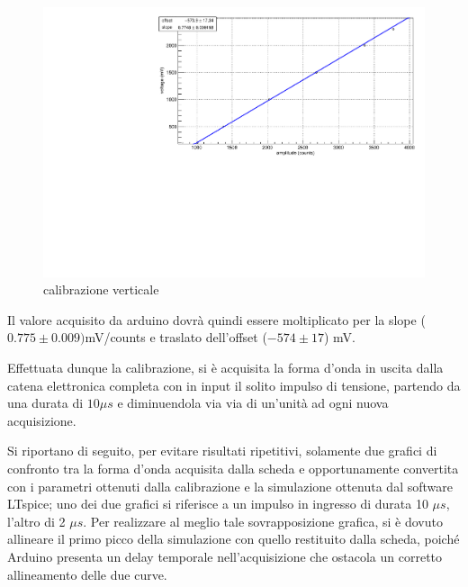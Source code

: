 \documentclass{article}
\begin{document}
\begin{center}
\begin{figure}[H]
\centering
\includegraphics[scale=0.4, angle=0]{calibverticale.pdf}
\caption{calibrazione verticale}
\label{fig:calibtempi}
\end{figure}
\end{center}

Il valore acquisito da arduino dovrà quindi essere moltiplicato per la slope ($0.775 \pm 0.009)$mV/counts
e traslato dell'offset ($-574 \pm 17$) mV.



Effettuata dunque la calibrazione, si è acquisita la forma d'onda in uscita dalla catena elettronica completa con in input il solito
impulso di tensione, partendo da una durata di $10 \mu s$ e diminuendola via via di un'unità ad ogni nuova acquisizione.

Si riportano di seguito, per evitare risultati ripetitivi, solamente due grafici di confronto tra la forma d'onda acquisita dalla scheda e opportunamente 
convertita con i parametri ottenuti dalla
calibrazione e la simulazione ottenuta dal software LTspice; uno dei due grafici si riferisce a un impulso in ingresso di durata 10 $\mu s$, l'altro di 2 $\mu s$.
Per realizzare al meglio tale sovrapposizione grafica, si è dovuto allineare il primo picco della simulazione con quello restituito dalla scheda, poiché Arduino
presenta un delay temporale nell'acquisizione che ostacola un corretto allineamento delle due curve.
\end{document}
